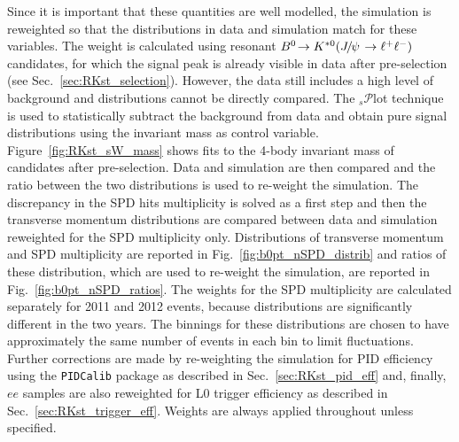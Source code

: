 Since it is important that these quantities are well modelled, the simulation is
reweighted so that the distributions in data and simulation match for these variables.
The weight is calculated using resonant $\decay{\Bz}{\Kstarz(\jpsi\to\ll)}$ candidates, for which the signal peak
is already visible in data after pre-selection (see Sec.~\ref{sec:RKst_selection}). However, the data still includes
a high level of background and distributions cannot be directly compared.
The $_s\mathcal{P}$lot technique~\cite{sPlot} is used to statistically subtract the background from
data and obtain pure signal distributions using the invariant mass as control variable.
Figure~\ref{fig:RKst_sW_mass} shows fits to the 4-body invariant mass of candidates after pre-selection.
Data and simulation are then compared and the ratio between the two distributions is used to re-weight
the simulation. The discrepancy in the SPD hits multiplicity is solved as a first step and then the \Bz transverse momentum 
distributions are compared between data and simulation reweighted for the SPD multiplicity only.
Distributions of \Bz transverse momentum and SPD multiplicity are reported in Fig.~\ref{fig:b0pt_nSPD_distrib}
and ratios of these distribution, which are used to re-weight the simulation, are reported in 
Fig.~\ref{fig:b0pt_nSPD_ratios}. The weights for the SPD multiplicity are calculated
separately for 2011 and 2012 events, because distributions are significantly different
in the two years. The binnings for these distributions are chosen to have approximately 
the same number of events in each bin to limit fluctuations.
Further corrections are made by re-weighting the simulation for PID efficiency using the
\verb!PIDCalib! package as described in Sec.~\ref{sec:RKst_pid_eff} and, finally, 
$ee$ samples are also reweighted for L0 trigger efficiency as described in Sec.~\ref{sec:RKst_trigger_eff}.
Weights are always applied throughout unless specified.

